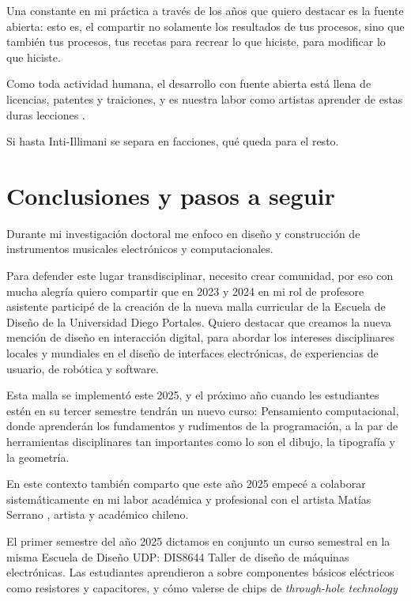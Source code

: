 \documentclass{article}
\begin{document}
Una constante en mi práctica a través de los años que quiero destacar es la fuente abierta: esto es, el compartir no solamente los resultados de tus procesos, sino que también tus procesos, tus recetas para recrear lo que hiciste, para modificar lo que hiciste.

Como toda actividad humana, el desarrollo con fuente abierta está llena de licencias, patentes y  traiciones, y es nuestra labor como artistas aprender de estas duras lecciones \cite{arduinoHistory}.

Si hasta Inti-Illimani se separa en facciones, qué queda para el resto.

\clearpage

\section{Conclusiones y pasos a seguir}

Durante mi investigación doctoral me enfoco en diseño y construcción de instrumentos musicales electrónicos y computacionales.

Para defender este lugar transdisciplinar, necesito crear comunidad, por eso con mucha alegría quiero compartir que en 2023 y 2024 en mi rol de profesore asistente participé de la creación de la nueva malla curricular de la Escuela de Diseño de la Universidad Diego Portales. Quiero destacar que creamos la nueva mención de diseño en interacción digital, para abordar los intereses disciplinares locales y mundiales en el diseño de interfaces electrónicas, de experiencias de usuario, de robótica y software.

Esta malla se implementó este 2025, y el próximo año cuando les estudiantes estén en su tercer semestre tendrán un nuevo curso: Pensamiento computacional, donde aprenderán los fundamentos y rudimentos de la programación, a la par de herramientas disciplinares tan importantes como lo son el dibujo, la tipografía y la geometría.

En este contexto también comparto que este año 2025 empecé a colaborar sistemáticamente en mi labor académica y profesional con el artista Matías Serrano \cite{misaa}, artista y académico chileno.

El primer semestre del año 2025 dictamos en conjunto un curso semestral en la misma Escuela de Diseño UDP: DIS8644 Taller de diseño de máquinas electrónicas. Las estudiantes aprendieron a sobre componentes básicos eléctricos como resistores y capacitores, y cómo valerse de chips de \textit{through-hole technology} \cite{tht}
\end{document}
